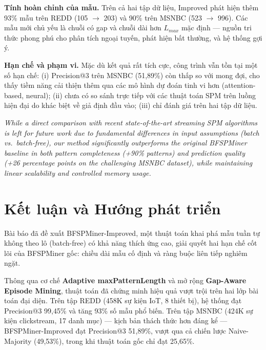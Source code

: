 \documentclass[conference]{IEEEtran}
\begin{document}
\textbf{Tính hoàn chỉnh của mẫu.} Trên cả hai tập dữ liệu, Improved phát hiện thêm 93\% mẫu trên REDD (105 $\rightarrow$ 203) và 90\% trên MSNBC (523 $\rightarrow$ 996). Các mẫu mới chủ yếu là chuỗi có gap và chuỗi dài hơn $L_{max}$ mặc định --- nguồn tri thức phong phú cho phân tích ngoại tuyến, phát hiện bất thường, và hệ thống gợi ý.

\textbf{Hạn chế và phạm vi.} Mặc dù kết quả rất tích cực, công trình vẫn tồn tại một số hạn chế: (i) Precision@3 trên MSNBC (51,89\%) còn thấp so với mong đợi, cho thấy tiềm năng cải thiện thêm qua các mô hình dự đoán tinh vi hơn (attention-based, neural); (ii) chưa có so sánh trực tiếp với các thuật toán SPM trên luồng hiện đại do khác biệt về giả định đầu vào; (iii) chỉ đánh giá trên hai tập dữ liệu.

\textit{While a direct comparison with recent state-of-the-art streaming SPM algorithms is left for future work due to fundamental differences in input assumptions (batch vs.~batch-free), our method significantly outperforms the original BFSPMiner baseline in both pattern completeness (+90\% patterns) and prediction quality (+26 percentage points on the challenging MSNBC dataset), while maintaining linear scalability and controlled memory usage.}

\section{Kết luận và Hướng phát triển}
\label{sec:conclusion}

Bài báo đã đề xuất BFSPMiner-Improved, một thuật toán khai phá mẫu tuần tự không theo lô (batch-free) có khả năng thích ứng cao, giải quyết hai hạn chế cốt lõi của BFSPMiner gốc: chiều dài mẫu cố định và ràng buộc liên tiếp nghiêm ngặt.

Thông qua cơ chế \textbf{Adaptive maxPatternLength} và mở rộng \textbf{Gap-Aware Episode Mining}, thuật toán đã chứng minh hiệu quả vượt trội trên hai lớp bài toán đại diện. Trên tập REDD (458K sự kiện IoT, 8 thiết bị), hệ thống đạt Precision@3 99,45\% và tăng 93\% số mẫu phổ biến. Trên tập MSNBC (424K sự kiện clickstream, 17 danh mục) --- kịch bản thách thức hơn đáng kể --- BFSPMiner-Improved đạt Precision@3 51,89\%, vượt qua cả chiến lược Naive-Majority (49,53\%), trong khi thuật toán gốc chỉ đạt 25,65\%.
\end{document}
